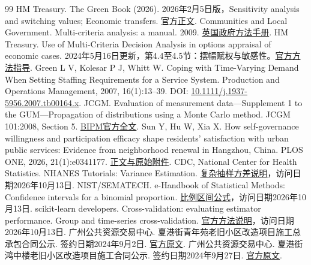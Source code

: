 \documentclass[UTF8,11pt,fontset=windows]{ctexart}
\begin{document}
\begin{thebibliography}{99}
 HM Treasury. The Green Book (2026). 2026年2月5日版，Sensitivity analysis and switching values; Economic transfers. \href{https://www.gov.uk/government/publications/the-green-book--2/the-green-book-2026}{官方正文}.
 Communities and Local Government. Multi-criteria analysis: a manual. 2009. \href{https://www.gov.uk/government/publications/multi-criteria-analysis-manual-for-making-government-policy}{英国政府方法手册}.
 HM Treasury. Use of Multi-Criteria Decision Analysis in options appraisal of economic cases. 2024年5月16日更新，第4.4至4.5节：摆幅赋权与敏感性。\href{https://www.gov.uk/government/publications/green-book-supplementary-guidance-multi-criteria-decision-analysis/use-of-multi-criteria-decision-analysis-in-options-appraisal-of-economic-cases}{官方方法指导}.
 Green L V, Kolesar P J, Whitt W. Coping with Time-Varying Demand When Setting Staffing Requirements for a Service System. Production and Operations Management, 2007, 16(1):13--39. DOI: \href{https://doi.org/10.1111/j.1937-5956.2007.tb00164.x}{10.1111/j.1937-5956.2007.tb00164.x}.
 JCGM. Evaluation of measurement data---Supplement 1 to the GUM---Propagation of distributions using a Monte Carlo method. JCGM 101:2008, Section 5. \href{https://www.bipm.org/documents/20126/2071204/JCGM_101_2008_E.pdf}{BIPM官方全文}.
 Sun Y, Hu W, Xia X. How self-governance willingness and participation efficacy shape residents' satisfaction with urban public services: Evidence from neighborhood renewal in Hangzhou, China. PLOS ONE, 2026, 21(1):e0341177. \href{https://doi.org/10.1371/journal.pone.0341177}{正文与原始附件}.
 CDC, National Center for Health Statistics. NHANES Tutorials: Variance Estimation. \href{https://wwwn.cdc.gov/nchs/nhanes/tutorials/varianceestimation.aspx}{复杂抽样方差说明}，访问日期2026年10月13日.
 NIST/SEMATECH. e-Handbook of Statistical Methods: Confidence intervals for a binomial proportion. \href{https://itl.nist.gov/div898/handbook/prc/section2/prc241.htm}{比例区间公式}，访问日期2026年10月13日.
 scikit-learn developers. Cross-validation: evaluating estimator performance. Group and time-series cross-validation. \href{https://scikit-learn.org/stable/modules/cross_validation.html}{官方方法说明}，访问日期2026年10月13日.
 广州公共资源交易中心. 夏港街青年苑老旧小区改造项目施工总承包合同公示. 签约日期2024年9月2日. \href{https://ywtb.gzggzy.cn/jyfw/002001/002001001/20240904/0020010011010131.html}{官方原文}.
 广州公共资源交易中心. 夏港街鸿中楼老旧小区改造项目施工合同公示. 签约日期2024年9月27日. \href{https://ywtb.gzggzy.cn/jyfw/002001/002001001/20241011/0020010011015508.html}{官方原文}.

\end{thebibliography}
\end{document}
